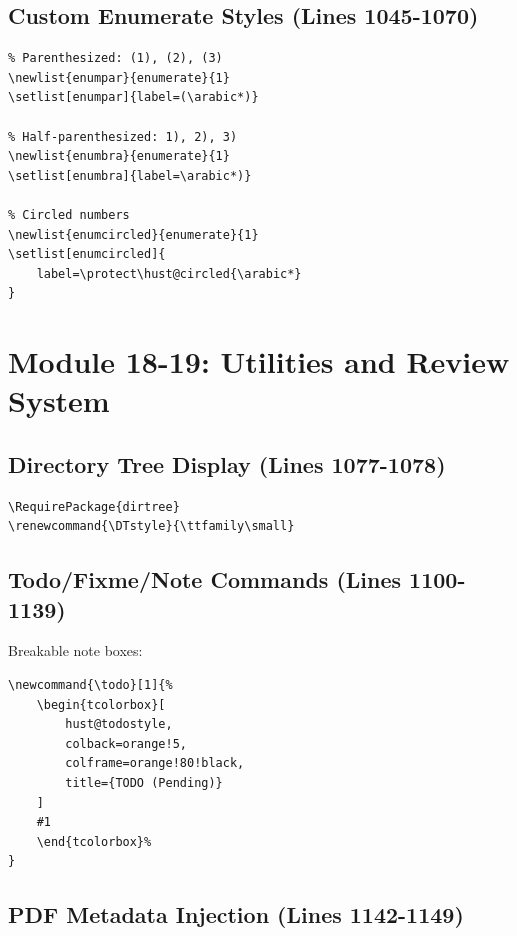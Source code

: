 \documentclass[linux]{hustreport}
\begin{document}
\subsection{Custom Enumerate Styles (Lines 1045-1070)}

\begin{verbatim}
% Parenthesized: (1), (2), (3)
\newlist{enumpar}{enumerate}{1}
\setlist[enumpar]{label=(\arabic*)}

% Half-parenthesized: 1), 2), 3)
\newlist{enumbra}{enumerate}{1}
\setlist[enumbra]{label=\arabic*)}

% Circled numbers
\newlist{enumcircled}{enumerate}{1}
\setlist[enumcircled]{
    label=\protect\hust@circled{\arabic*}
}
\end{verbatim}

\newpage
\section{Module 18-19: Utilities and Review System}

\subsection{Directory Tree Display (Lines 1077-1078)}

\begin{verbatim}
\RequirePackage{dirtree}
\renewcommand{\DTstyle}{\ttfamily\small}
\end{verbatim}

\subsection{Todo/Fixme/Note Commands (Lines 1100-1139)}

Breakable note boxes:

\begin{verbatim}
\newcommand{\todo}[1]{%
    \begin{tcolorbox}[
        hust@todostyle,
        colback=orange!5,
        colframe=orange!80!black,
        title={TODO (Pending)}
    ]
    #1
    \end{tcolorbox}%
}
\end{verbatim}

\subsection{PDF Metadata Injection (Lines 1142-1149)}
\end{document}
